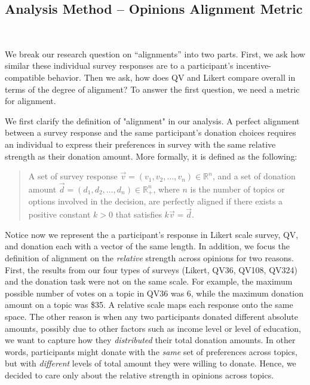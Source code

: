 \subsection{Analysis Method -- Opinions Alignment Metric}~\label{alignment_metric}

We break our research question on ``alignments'' into two parts. First, we ask how similar these individual survey responses are to a participant's incentive-compatible behavior. Then we ask, how does QV and Likert compare overall in terms of the degree of alignment? To answer the first question, we need a metric for alignment.

We first clarify the definition of "alignment" in our analysis. A perfect alignment between a survey response and the same participant's donation choices requires an individual to express their preferences in survey with the same relative strength as their donation amount. More formally, it is defined as the following:

\begin{quote}
    A set of survey response $\vec{v} = (v_1, v_2, \dots, v_n) \in \mathbb{R}^n$, and a set of donation amount $\vec{d} = (d_1, d_2, \dots, d_n)\in \mathbb{R}_{+}^n$, where $n$ is the number of topics or options involved in the decision, are perfectly aligned if there exists a positive constant $k>0$ that satisfies $k\vec{v} = \vec{d}$.
\end{quote}

Notice now we represent the a participant's response in Likert scale survey, QV, and donation each with a vector of the same length. In addition, we focus the definition of alignment on the \textit{relative} strength across opinions for two reasons. First, the results from our four types of surveys (Likert, QV36, QV108, QV324) and the donation task were not on the same scale. For example, the maximum possible number of votes on a topic in QV36 was 6, while the maximum donation amount on a topic was \$35. A relative scale maps each response onto the same space. The other reason is when any two participants donated different absolute amounts, possibly due to other factors such as income level or level of education, we want to capture how they \textit{distributed} their total donation amounts. In other words, participants might donate with the \textit{same} set of preferences across topics, but with \textit{different} levels of total amount they were willing to donate. Hence, we decided to care only about the relative strength in opinions across topics.

